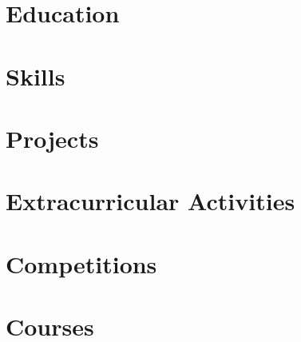 \documentclass[letter,10pt]{article}
\begin{document}


\section{Education}



% 

\section{Skills}



\section{Projects}


\section{Extracurricular Activities}




\newpage

\section{Competitions}




\section{Courses}

\end{document}
